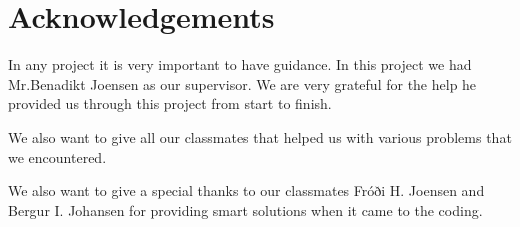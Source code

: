 




\begingroup

\let\clearpage\relax
\let\cleardoublepage\relax
\let\cleardoublepage\relax

\chapter*{Acknowledgements}

In any project it is very important to have guidance. In this project we had Mr.Benadikt Joensen as our supervisor. We are very grateful for the help he provided us through this project from start to finish. 

We also want to give all our classmates that helped us with various problems that we encountered. 

We also want to give a special thanks to our classmates Fróði H. Joensen and Bergur I. Johansen for providing smart solutions when it came to the coding. 

\endgroup